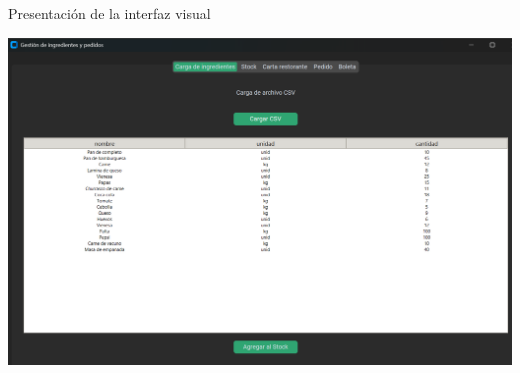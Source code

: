 \documentclass{beamer}
\begin{document}
\begin{frame}{Presentación de la interfaz visual}
    \begin{center}
        \includegraphics[width=1\textwidth]{images/Interfaz.png}
    \end{center}
\end{frame}
\end{document}
